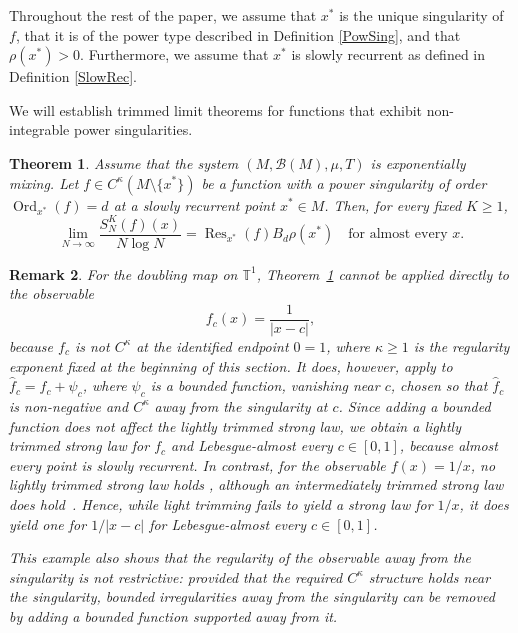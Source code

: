 \documentclass[11pt,twoside,a4paper,reqno]{amsart}
\newtheorem{theorem}{Theorem}
\newtheorem{remark}[theorem]{Remark}
\begin{document}
Throughout the rest of the paper, we assume that $x^*$ is the unique singularity of $f$, that it is of the power type described in Definition \ref{PowSing}, and that $\rho(x^*)>0$. Furthermore, we assume that $x^*$ is slowly recurrent as defined in Definition \ref{SlowRec}.



We will establish trimmed limit theorems for functions that exhibit non-integrable power singularities.

\begin{theorem}\label{lightSLLN}
Assume that the system $(M, \mathcal{B}(M), \mu, T)$ is exponentially mixing. Let $f \in C^{\kappa}(M \setminus \{x^*\})$ be a function with a power singularity of order $\operatorname{Ord}_{x^*}(f)=d$ at a slowly recurrent point $x^*\in M$. Then, for every fixed $K \geq 1$,
\begin{equation*}
\lim_{N \to \infty} \frac{S_N^K(f)(x)}{N \log N} = \operatorname{Res}_{x^*}(f)B_d \rho(x^*) \quad \text{for almost every } x.
\end{equation*}
\end{theorem}



\begin{remark}
For the doubling map on $\mathbb T^1$, Theorem~\ref{lightSLLN} cannot be applied directly to the observable
$$f_c(x)=\frac{1}{|x-c|},$$
because $f_c$ is not $C^\kappa$ at the identified endpoint $0=1$, where $\kappa\geq 1$ is the regularity exponent fixed at the beginning of this section. It does, however, apply to $\hat f_c=f_c+\psi_c$, where $\psi_c$ is a bounded function, vanishing near $c$, chosen so that $\hat f_c$ is non-negative and $C^\kappa$  away from the singularity at $c$. Since adding a bounded function does not affect the lightly trimmed strong law, we obtain a lightly trimmed strong law for $f_c$ and Lebesgue-almost every $c\in[0,1]$, because almost every point is slowly recurrent. In contrast, for the observable $f(x)=1/x$, no lightly trimmed strong law holds \cite{Haynes14}, although an intermediately trimmed strong law does hold~\cite{Sch18}. Hence, while light trimming fails to yield a strong law for $1/x$, it does yield one for $1/|x-c|$ for Lebesgue-almost every $c\in[0,1]$.

This example also shows that the regularity of the observable away from the singularity is not restrictive: provided that the required $C^\kappa$ structure holds near the singularity, bounded irregularities away from the singularity can be removed by adding a bounded function supported away from it.
\end{remark}
\end{document}
